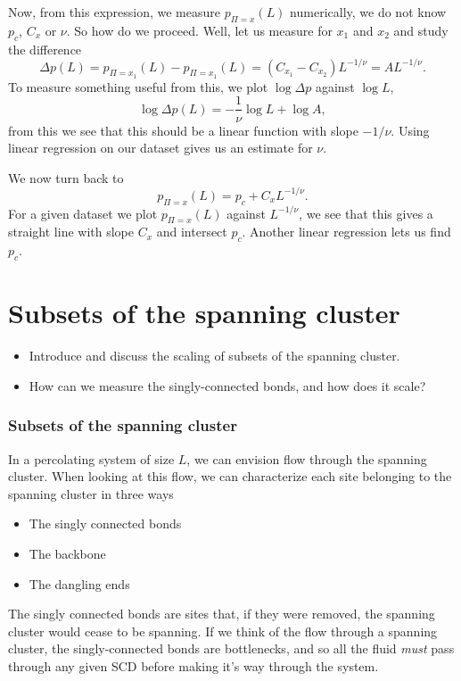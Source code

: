 \documentclass[a4paper, 11pt, notitlepage, english]{article}
\begin{document}
Now, from this expression, we measure $p_{\Pi=x}(L)$ numerically, we do not know $p_c$, $C_x$ or $\nu$. So how do we proceed. Well, let us measure for $x_1$ and $x_2$ and study the difference
$$\Delta p(L) = p_{\Pi=x_1}(L) - p_{\Pi=x_1}(L) = (C_{x_1} - C_{x_2}) L^{-1/\nu} = AL^{-1/\nu}.$$
To measure something useful from this, we plot $\log \Delta p$ against $\log L$, 
$$\log \Delta p(L) = -\frac{1}{\nu}\log L + \log A,$$
from this we see that this should be a linear function with slope $-1/\nu$. Using linear regression on our dataset gives us an estimate for $\nu$.

We now turn back to 
$$p_{\Pi=x}(L) = p_c + C_x L^{-1/\nu}.$$
For a given dataset we plot $p_{\Pi=x}(L)$ against $L^{-1/\nu}$, we see that this gives a straight line with slope $C_x$ and intersect $p_c$. Another linear regression lets us find $p_c$.




\clearpage


\section{ Subsets of the spanning cluster}
\begin{itemize}
	\item Introduce and discuss the scaling of subsets of the spanning cluster.
	\item How can we measure the singly-connected bonds, and how does it scale?
\end{itemize}

\subsubsection*{Subsets of the spanning cluster}

In a percolating system of size $L$, we can envision flow through the spanning cluster. When looking at this flow, we can characterize each site belonging to the spanning cluster in three ways
\begin{itemize}
	\item The singly connected bonds 
	\item The backbone
	\item The dangling ends
\end{itemize}

The singly connected bonds are sites that, if they were removed, the spanning cluster would cease to be spanning. If we think of the flow through a spanning cluster, the singly-connected bonds are bottlenecks, and so all the fluid \emph{must} pass through any given SCD before making it's way through the system. 
\end{document}
